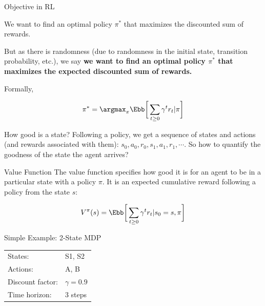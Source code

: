 \documentclass[aspectratio=169,xcolor=dvipsnames,svgnames,x11names,fleqn]{beamer}
\begin{document}
\begin{frame}{Objective in RL}
\begin{center}
    We want to find an optimal policy $\pi^*$ that maximizes the discounted sum of rewards.

    But as there is randomness (due to randomness in the initial state, transition probability, etc.), we say \textbf{we want to find an optimal policy $\pi^*$ that maximizes the expected discounted sum of rewards.}
\end{center}

Formally,

$$
\pi^* = \argmax_\pi  \Ebb\bigg[ \sum_{t\geq 0} \gamma^t r_t | \pi \bigg]
$$
    
\end{frame}


\begin{frame}{How good is a state?}
    Following a policy, we get a sequence of states and actions (and rewards associated with them): $s_0, a_0, r_0, s_1, a_1, r_1, \cdots $. So how to quantify the goodness of the state the agent arrives?
\end{frame}



\begin{frame}{Value Function}
The value function specifies how good it is for an agent to be in a particular state with a policy $\pi$. It is an expected cumulative reward following a policy from the state $s$:

$$
V^\pi (s) = \Ebb \bigg[ \sum_{t\geq 0} \gamma^t r_t | s_0 = s, \pi \bigg]
$$
    
\end{frame}


\begin{frame}{Simple Example: 2-State MDP}
    
    \vspace{0.5cm}
    \begin{center}
    \large{
    \begin{tabular}{ll}
    States: & S1, S2 \\
    Actions: & A, B \\
    Discount factor: & $\gamma = 0.9$ \\
    Time horizon: & 3 steps
    \end{tabular}
    }
    \end{center}
\end{frame}
\end{document}
